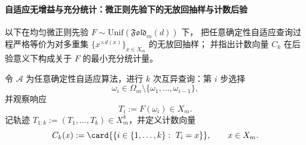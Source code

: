 \paragraph{自适应无增益与充分统计：微正则先验下的无放回抽样与计数后验}
以下在均匀微正则先验 \(F\sim\mathrm{Unif}(\mathfrak{Fold}_m(d))\) 下，
把任意确定性自适应查询过程严格等价为对多重集 \(\{x^{\times d(x)}\}_{x\in X_m}\) 的无放回抽样；
并指出计数向量 \(C_k\) 在后验意义下构成关于 \(F\) 的最小充分统计量。

\begin{definition}[自适应互异查询轨迹与计数统计]\label{def:pom-microcanonical-adaptive-trajectory-counts}
令 \(\mathcal{A}\) 为任意确定性自适应算法，进行 \(k\) 次互异查询：第 \(i\) 步选择
\[
\omega_i\in\Omega_m\setminus\{\omega_1,\dots,\omega_{i-1}\},
\]
并观察响应
\[
T_i:=F(\omega_i)\in X_m.
\]
记轨迹 \(T_{1:k}:=(T_1,\dots,T_k)\in X_m^k\)，并定义计数向量
\[
C_k(x):=\card{\{i\in\{1,\dots,k\}:\ T_i=x\}},\qquad x\in X_m.
\]
\end{definition}

